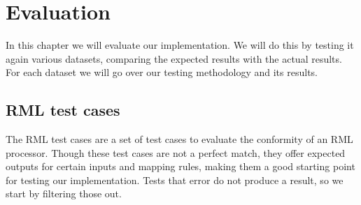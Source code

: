 \chapter{Evaluation}
\label{chapter:evaluation}
In this chapter we will evaluate our implementation. We will do this by testing it again various datasets, comparing the expected results with the actual results. For each dataset we will go over our testing methodology and its results. 
\section{RML test cases}
\label{section:rml_test_cases}
The RML test cases are a set of test cases to evaluate the conformity of an RML processor. Though these test cases are not a perfect match, they offer expected outputs for certain inputs and mapping rules, making them a good starting point for testing our implementation. Tests that error do not produce a result, so we start by filtering those out. 

